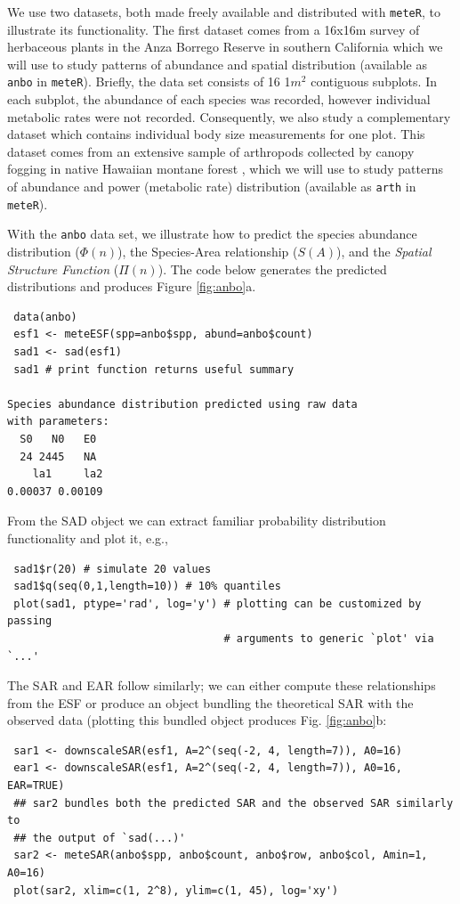 We use two datasets, both made freely available and distributed with
\texttt{meteR}, to illustrate its functionality. The first dataset
comes from a 16x16m survey of herbaceous plants in the Anza Borrego
Reserve in southern California \cite{Harte:2011ut} which we will use
to study patterns of abundance and spatial distribution (available as
\texttt{anbo} in \texttt{meteR}). Briefly, the data set consists of 16
1$m^2$ contiguous subplots. In each subplot, the abundance of each
species was recorded, however individual metabolic rates were not
recorded. Consequently, we also study a complementary dataset which
contains individual body size measurements for one plot. This dataset
comes from an extensive sample of arthropods collected by canopy
fogging in native Hawaiian montane forest \cite{gruner2007}, which we
will use to study patterns of abundance and power (metabolic rate)
distribution (available as \texttt{arth} in \texttt{meteR}).

With the \texttt{anbo} data set, we illustrate how to predict the species
abundance distribution ($\Phi(n)$), the Species-Area relationship
($S(A)$), and the \textit{Spatial Structure Function} ($\Pi(n)$). The
code below generates the predicted distributions and produces Figure
\ref{fig:anbo}a.

\begin{verbatim}
 data(anbo)
 esf1 <- meteESF(spp=anbo$spp, abund=anbo$count)          
 sad1 <- sad(esf1)
 sad1 # print function returns useful summary

Species abundance distribution predicted using raw data 
with parameters: 
  S0   N0   E0 
  24 2445   NA 
    la1     la2 
0.00037 0.00109 
\end{verbatim}

From the SAD object we can extract familiar probability distribution
functionality and plot it, e.g.,

\begin{verbatim}
 sad1$r(20) # simulate 20 values
 sad1$q(seq(0,1,length=10)) # 10% quantiles
 plot(sad1, ptype='rad', log='y') # plotting can be customized by passing 
                                  # arguments to generic `plot' via `...'
\end{verbatim}

The SAR and EAR follow similarly; we can either compute these
relationships from the ESF or produce an object bundling the
theoretical SAR with the observed data (plotting this bundled object
produces Fig. \ref{fig:anbo}b:

\begin{verbatim}
 sar1 <- downscaleSAR(esf1, A=2^(seq(-2, 4, length=7)), A0=16)
 ear1 <- downscaleSAR(esf1, A=2^(seq(-2, 4, length=7)), A0=16, EAR=TRUE)
 ## sar2 bundles both the predicted SAR and the observed SAR similarly to 
 ## the output of `sad(...)'
 sar2 <- meteSAR(anbo$spp, anbo$count, anbo$row, anbo$col, Amin=1, A0=16)
 plot(sar2, xlim=c(1, 2^8), ylim=c(1, 45), log='xy')
\end{verbatim}

